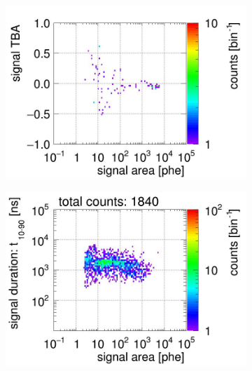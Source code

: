 \begin{landscape}
\begin{figure}[!p]
\begin{subfigure}[t]{0.32\textwidth}
		\includegraphics[width=\figurewidth,clip,trim={0 8 0 40}]{Figures/GasTest/CutsValid/res64767/tbapaX11Vecfig64767.jpg}
		\caption{}
		\label{fig:signal selection 11}
	\end{subfigure}
	\begin{subfigure}[t]{0.32\textwidth}
		\centering
		\includegraphics[width=\figurewidth,clip,trim={0 98 0 15}]{Figures/GasTest/CutsValid/res64767/pdpa12Vecfig64767.jpg}

\end{subfigure}
\end{figure}
\end{landscape}
